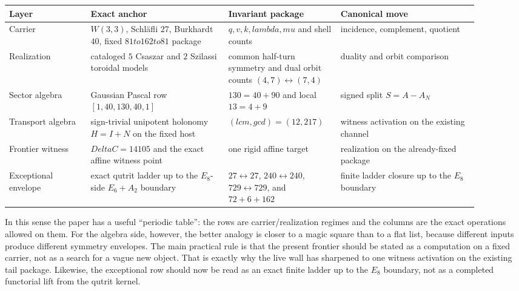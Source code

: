 \documentclass[12pt,a4paper]{article}
\def\mathrm#1{#1}%
\def\textbf#1{#1}%
\def\Delta{Delta}%
\def\lambda{lambda}%
\def\mu{mu}%
\def\to{ to }%
\theoremstyle{definition}
\begin{document}
{\small
\begin{center}
\begin{tabular}{@{}p{0.16\linewidth}p{0.27\linewidth}p{0.20\linewidth}p{0.27\linewidth}@{}}
\toprule
\textbf{Layer} & \textbf{Exact anchor} & \textbf{Invariant package} & \textbf{Canonical move} \\
\midrule
Carrier
&
$W(3,3)$, Schl\"afli $27$, Burkhardt $40$, fixed $81\to 162\to 81$ package
&
$q,v,k,\lambda,\mu$ and shell counts
&
incidence, complement, quotient \\

Realization
&
cataloged $5$ Csaszar and $2$ Szilassi toroidal models
&
common half-turn symmetry and dual orbit counts $(4,7)\leftrightarrow(7,4)$
&
duality and orbit comparison \\

Sector algebra
&
Gaussian Pascal row $[1,40,130,40,1]$
&
$130=40+90$ and local $13=4+9$
&
signed split $S=A-A_N$ \\

Transport algebra
&
sign-trivial unipotent holonomy $H=I+N$ on the fixed host
&
$(\mathrm{lcm},\mathrm{gcd})=(12,217)$
&
witness activation on the existing channel \\

Frontier witness
&
$\Delta C=14105$ and the exact affine witness point
&
one rigid affine target
&
realization on the already-fixed package \\

Exceptional envelope
&
exact qutrit ladder up to the $E_8$-side $E_6+A_2$ boundary
&
$27\leftrightarrow 27$, $240\leftrightarrow 240$, $729\leftrightarrow 729$, and $72+6+162$
&
finite ladder closure up to the $E_8$ boundary \\
\bottomrule
\end{tabular}
\end{center}
}

In this sense the paper has a useful ``periodic table'': the rows are
carrier/realization regimes and the columns are the exact operations
allowed on them.  For the algebra side, however, the better analogy is
closer to a magic square than to a flat list, because different inputs
produce different symmetry envelopes.  The main practical rule is that
the present frontier should be stated as a computation on a fixed
carrier, not as a search for a vague new object.  That is exactly why
the live wall has sharpened to one witness activation on the existing
tail package.  Likewise, the exceptional row should now be read as an
exact finite ladder up to the $E_8$ boundary, not as a completed
functorial lift from the qutrit kernel.
\end{document}

